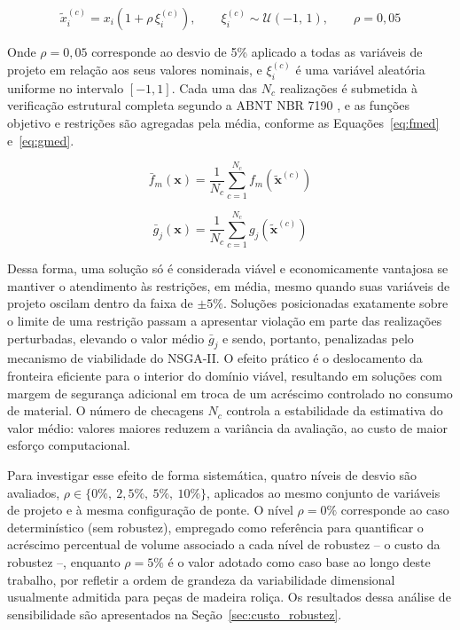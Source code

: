 \begin{equation}
\tilde{x}_i^{(c)} = x_i \left(1 + \rho\,\xi_i^{(c)}\right),
\qquad \xi_i^{(c)} \sim \mathcal{U}(-1,\,1),
\qquad \rho = 0{,}05
\label{eq:perturbacao}
\end{equation}

Onde $\rho = 0{,}05$ corresponde ao desvio de 5\% aplicado a todas as variáveis de projeto em relação aos seus valores nominais, e $\xi_i^{(c)}$ é uma variável aleatória uniforme no intervalo $[-1, 1]$. Cada uma das $N_c$ realizações é submetida à verificação estrutural completa segundo a ABNT NBR 7190 \parencite{NBR7190-1:2022}, e as funções objetivo e restrições são agregadas pela média, conforme as Equações~\eqref{eq:fmed} e~\eqref{eq:gmed}.

\begin{equation}
\bar{f}_m(\mathbf{x}) = \frac{1}{N_c}\sum_{c=1}^{N_c} f_m\!\left(\tilde{\mathbf{x}}^{(c)}\right)
\label{eq:fmed}
\end{equation}

\begin{equation}
\bar{g}_j(\mathbf{x}) = \frac{1}{N_c}\sum_{c=1}^{N_c} g_j\!\left(\tilde{\mathbf{x}}^{(c)}\right)
\label{eq:gmed}
\end{equation}

Dessa forma, uma solução só é considerada viável e economicamente vantajosa se mantiver o atendimento às restrições, em média, mesmo quando suas variáveis de projeto oscilam dentro da faixa de $\pm 5\%$. Soluções posicionadas exatamente sobre o limite de uma restrição passam a apresentar violação em parte das realizações perturbadas, elevando o valor médio $\bar{g}_j$ e sendo, portanto, penalizadas pelo mecanismo de viabilidade do NSGA-II. O efeito prático é o deslocamento da fronteira eficiente para o interior do domínio viável, resultando em soluções com margem de segurança adicional em troca de um acréscimo controlado no consumo de material. O número de checagens $N_c$ controla a estabilidade da estimativa do valor médio: valores maiores reduzem a variância da avaliação, ao custo de maior esforço computacional.

Para investigar esse efeito de forma sistemática, quatro níveis de desvio são avaliados, $\rho \in \{0\%,\ 2{,}5\%,\ 5\%,\ 10\%\}$, aplicados ao mesmo conjunto de variáveis de projeto e à mesma configuração de ponte. O nível $\rho = 0\%$ corresponde ao caso determinístico (sem robustez), empregado como referência para quantificar o acréscimo percentual de volume associado a cada nível de robustez -- o custo da robustez --, enquanto $\rho = 5\%$ é o valor adotado como caso base ao longo deste trabalho, por refletir a ordem de grandeza da variabilidade dimensional usualmente admitida para peças de madeira roliça. Os resultados dessa análise de sensibilidade são apresentados na Seção~\ref{sec:custo_robustez}.

